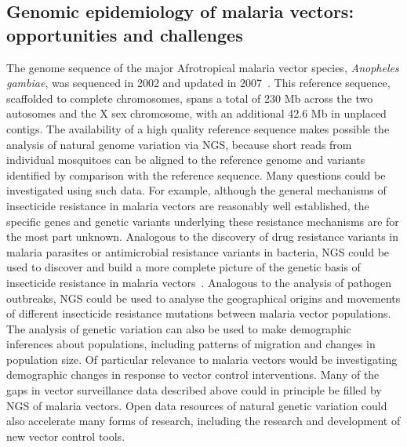 \begin{refsection}
\section{Genomic epidemiology of malaria vectors: opportunities and challenges}\label{sec:genomic-epi}


The genome sequence of the major Afrotropical malaria vector species, \textit{Anopheles gambiae}, was sequenced in 2002 and updated in 2007~\parencite{Holt2002,Sharakhova2007}.
%
This reference sequence, scaffolded to complete chromosomes, spans a total of 230 Mb across the two autosomes and the X sex chromosome, with an additional 42.6 Mb in unplaced contigs.
%
The availability of a high quality reference sequence makes possible the analysis of natural genome variation via NGS, because short reads from individual mosquitoes can be aligned to the reference genome and variants identified by comparison with the reference sequence.
%
Many questions could be investigated using such data.
%
For example, although the general mechanisms of insecticide resistance in malaria vectors are reasonably well established, the specific genes and genetic variants underlying these resistance mechanisms are for the most part unknown.
%
Analogous to the discovery of drug resistance variants in malaria parasites or antimicrobial resistance variants in bacteria, NGS could be used to discover and build a more complete picture of the genetic basis of insecticide resistance in malaria vectors~\parencite{Donnelly2016}.
%
Analogous to the analysis of pathogen outbreaks, NGS could be used to analyse the geographical origins and movements of different insecticide resistance mutations between malaria vector populations.
%
The analysis of genetic variation can also be used to make demographic inferences about populations, including patterns of migration and changes in population size.
%
Of particular relevance to malaria vectors would be investigating demographic changes in response to vector control interventions.
%
Many of the gaps in vector surveillance data described above could in principle be filled by NGS of malaria vectors.
%
Open data resources of natural genetic variation could also accelerate many forms of research, including the research and development of new vector control tools.



\end{refsection}
